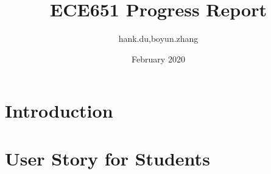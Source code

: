 \documentclass{article}
\title{ECE651 Progress Report}
\author{hank.du,boyun.zhang }
\date{February 2020}
\begin{document}
\maketitle

\section{Introduction}

\section{User Story for Students}
\end{document}
